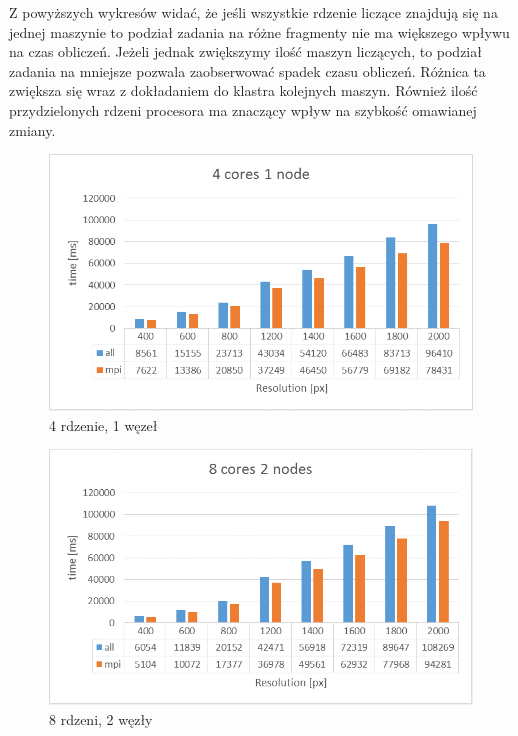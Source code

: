\documentclass[a4paper]{article}
\begin{document}
Z powyższych wykresów widać, że jeśli wszystkie rdzenie liczące znajdują się na jednej maszynie to podział zadania na różne fragmenty nie ma większego wpływu na czas obliczeń. Jeżeli jednak zwiększymy ilość maszyn liczących, to podział zadania na mniejsze pozwala zaobserwować spadek czasu obliczeń. Różnica ta zwiększa się wraz z dokładaniem do klastra kolejnych maszyn. Również ilość przydzielonych rdzeni procesora ma znaczący wpływ na szybkość omawianej zmiany.

\begin{figure}[H]
    \centering
    \includegraphics[width=\textwidth]{2-4c1n.png}
    \caption{4 rdzenie, 1 węzeł}
    \label{fig:my_frac}
\end{figure}
\begin{figure}[H]
    \centering
    \includegraphics[width=\textwidth]{2-8c2n.png}
    \caption{8 rdzeni, 2 węzły}
    \label{fig:my_frac}
\end{figure}
\end{document}
